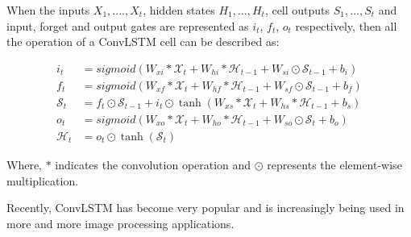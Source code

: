 When the inputs $X_1, ...., X_t$, hidden states $H_1, ..., H_t$, cell outputs $S_1, ..., S_t$ and input, forget and output gates are represented as $i_t$, $f_t$, $o_t$ respectively, then all the operation of a ConvLSTM cell can be described as:

\begin{equation}
\begin{aligned}
i_{t} &=sigmoid\left(W_{x i} * \mathcal{X}_{t}+W_{h i} * \mathcal{H}_{t-1}+W_{s i} \odot \mathcal{S}_{t-1}+b_{i}\right) \\
f_{t} &=sigmoid\left(W_{x f} * \mathcal{X}_{t}+W_{h f} * \mathcal{H}_{t-1}+W_{s f} \odot \mathcal{S}_{t-1}+b_{f}\right) \\
\mathcal{S}_{t} &=f_{t} \odot \mathcal{S}_{t-1}+i_{t} \odot \tanh \left(W_{x s} * \mathcal{X}_{t}+W_{h s} * \mathcal{H}_{t-1}+b_{s}\right) \\
o_{t} &=sigmoid\left(W_{x o} * \mathcal{X}_{t}+W_{h o} * \mathcal{H}_{t-1}+W_{s o} \odot \mathcal{S}_{t}+b_{o}\right) \\
\mathcal{H}_{t} &=o_{t} \odot \tanh \left(\mathcal{S}_{t}\right)
\end{aligned}
\label{eq:eq5}
\end{equation}

Where, $*$ indicates the convolution operation and $\odot$ represents the element-wise multiplication.

Recently, ConvLSTM has become very popular and is increasingly being used in more and more image processing applications.  
